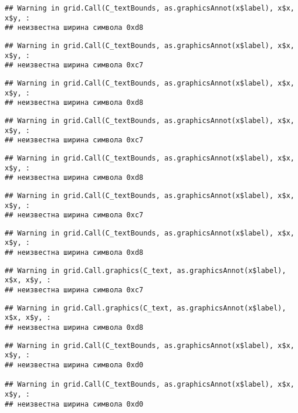 \documentclass[
]{article}
\begin{document}
\begin{verbatim}
## Warning in grid.Call(C_textBounds, as.graphicsAnnot(x$label), x$x, x$y, :
## неизвестна ширина символа 0xd8
\end{verbatim}

\begin{verbatim}
## Warning in grid.Call(C_textBounds, as.graphicsAnnot(x$label), x$x, x$y, :
## неизвестна ширина символа 0xc7
\end{verbatim}

\begin{verbatim}
## Warning in grid.Call(C_textBounds, as.graphicsAnnot(x$label), x$x, x$y, :
## неизвестна ширина символа 0xd8
\end{verbatim}

\begin{verbatim}
## Warning in grid.Call(C_textBounds, as.graphicsAnnot(x$label), x$x, x$y, :
## неизвестна ширина символа 0xc7
\end{verbatim}

\begin{verbatim}
## Warning in grid.Call(C_textBounds, as.graphicsAnnot(x$label), x$x, x$y, :
## неизвестна ширина символа 0xd8
\end{verbatim}

\begin{verbatim}
## Warning in grid.Call(C_textBounds, as.graphicsAnnot(x$label), x$x, x$y, :
## неизвестна ширина символа 0xc7
\end{verbatim}

\begin{verbatim}
## Warning in grid.Call(C_textBounds, as.graphicsAnnot(x$label), x$x, x$y, :
## неизвестна ширина символа 0xd8
\end{verbatim}

\begin{verbatim}
## Warning in grid.Call.graphics(C_text, as.graphicsAnnot(x$label), x$x, x$y, :
## неизвестна ширина символа 0xc7
\end{verbatim}

\begin{verbatim}
## Warning in grid.Call.graphics(C_text, as.graphicsAnnot(x$label), x$x, x$y, :
## неизвестна ширина символа 0xd8
\end{verbatim}

\begin{verbatim}
## Warning in grid.Call(C_textBounds, as.graphicsAnnot(x$label), x$x, x$y, :
## неизвестна ширина символа 0xd0

## Warning in grid.Call(C_textBounds, as.graphicsAnnot(x$label), x$x, x$y, :
## неизвестна ширина символа 0xd0
\end{verbatim}
\end{document}
